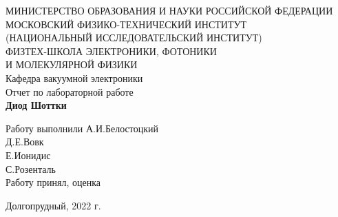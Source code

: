 \documentclass[a4paper,12pt]{article}
\begin{document}
 

\begin{titlepage}
	\begin{center}
		\large 	МИНИСТЕРСТВО ОБРАЗОВАНИЯ И НАУКИ РОССИЙСКОЙ ФЕДЕРАЦИИ\\
				МОСКОВСКИЙ ФИЗИКО-ТЕХНИЧЕСКИЙ ИНСТИТУТ \\
				(НАЦИОНАЛЬНЫЙ ИССЛЕДОВАТЕЛЬСКИЙ ИНСТИТУТ)\\ 
				ФИЗТЕХ-ШКОЛА ЭЛЕКТРОНИКИ, ФОТОНИКИ \\
				И МОЛЕКУЛЯРНОЙ ФИЗИКИ \\
		
		
		\vspace{4.0 cm}
		\LARGE{Кафедра вакуумной электроники \\ 
		Отчет по лабораторной работе} \\ 
		\LARGE \textbf{Диод Шоттки} \\
	\end{center}
	\vspace{3 cm} \large

	\begin{flushleft}
		Работу выполнили \hspace{5.5cm}  \underline{\hspace{3cm}} А.И.Белостоцкий \\	
		\hspace{9.8cm}  \underline{\hspace{3cm}} Д.Е.Вовк \\
		\hspace{9.8cm}  \underline{\hspace{3cm}} Е.Ионидис \\
		\hspace{9.8cm}  \underline{\hspace{3cm}} С.Розенталь \\
		\vspace{2cm}
		Работу принял, оценка \hspace{4.3cm} \underline{\hspace{3cm}}
	\end{flushleft}
	
	
	\vfill

	\begin{center}
	Долгопрудный, 2022 г.
	\end{center}
\end{titlepage}                                                                      

\tableofcontents
\end{document}
